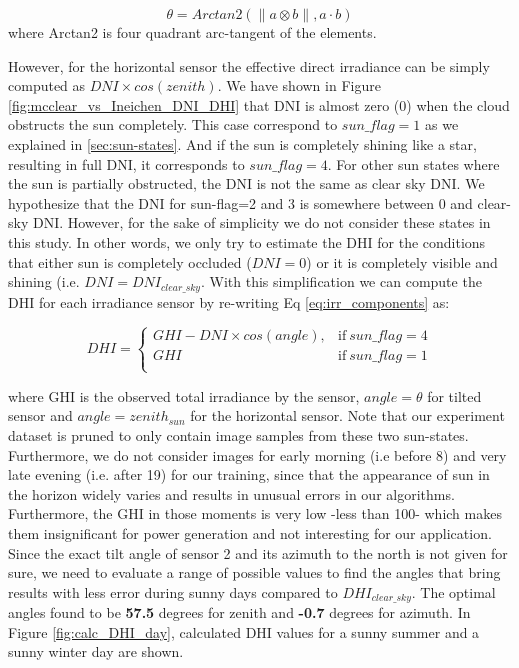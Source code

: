 \begin{equation}
\label{eq:angle_sun_tilted}
\theta = Arctan2(\| a \otimes b \|, a \cdot b)
\end{equation} 
where Arctan2 is four quadrant arc-tangent of the elements.

However, for the horizontal sensor the effective direct irradiance can be simply computed as $DNI \times cos(zenith)$. We have shown in Figure \ref{fig:mcclear_vs_Ineichen_DNI_DHI} that DNI is almost zero (0) when the cloud obstructs the sun completely. This case correspond to $sun\_flag=1$ as we explained in \ref{sec:sun-states}. And if the sun is completely shining like a star, resulting in full DNI, it corresponds to $sun\_flag=4$. For other sun states where the sun is partially obstructed, the DNI is not the same as clear sky DNI. We hypothesize that the DNI for sun-flag=2 and 3 is somewhere between 0 and clear-sky DNI. However, for the sake of simplicity we do not consider these states in this study. In other words, we only try to estimate the DHI for the conditions that either sun is completely occluded ($DNI=0$) or it is completely visible and shining (i.e. $DNI=DNI_{clear\_sky}$. With this simplification we can compute the DHI for each irradiance sensor by re-writing Eq \ref{eq:irr_components} as:

\begin{equation}
\label{eq:DHI_eq}
DHI =
\begin{cases}
GHI - DNI \times cos (angle), & \text{if}\ sun\_flag=4 \\
GHI & \text{if}\ sun\_flag=1 \\
\end{cases}
\end{equation}

where GHI is the observed total irradiance by the sensor, $angle=\theta$ for tilted sensor and $angle=zenith_{sun}$ for the horizontal sensor. Note that our experiment dataset is pruned to only contain image samples from these two sun-states. Furthermore, we do not consider images for early morning (i.e before 8) and very late evening (i.e. after 19) for our training, since that the appearance of sun in the horizon widely varies and results in unusual errors in our algorithms. Furthermore, the GHI in those moments is very low -less than 100- which makes them insignificant for power generation and not interesting for our application. Since the exact tilt angle of sensor 2 and its azimuth to the north is not given for sure, we need to evaluate a range of possible values to find the angles that bring results with less error during sunny days compared to $DHI_{clear\_sky}$. The optimal angles found to be \textbf{57.5} degrees for zenith and \textbf{-0.7} degrees for azimuth. 
In Figure \ref{fig:calc_DHI_day}, calculated DHI values for a sunny summer and a sunny winter day are shown.

